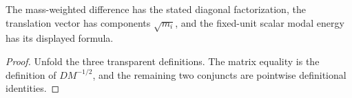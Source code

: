 \begin{theorem}
\label{thm:harmonic:data-spec}
The mass-weighted difference has the stated diagonal factorization, the
translation vector has components $\sqrt{m_i}$, and the fixed-unit scalar
modal energy has its displayed formula.
\end{theorem}
\begin{proof}

\leanok
Unfold the three transparent definitions.  The matrix equality is the
definition of $DM^{-1/2}$, and the remaining two conjuncts are pointwise
definitional identities.
\end{proof}
